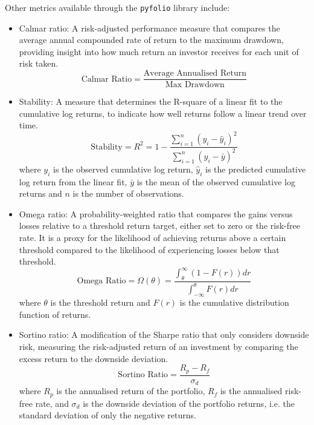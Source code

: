 Other metrics available through the \texttt{pyfolio} library include:
\begin{itemize}
    \item Calmar ratio: A risk-adjusted performance measure that compares the average annual compounded rate of return to the maximum drawdown, providing insight into how much return an investor receives for each unit of risk taken.
    \begin{equation}
        \text{Calmar Ratio} = \frac{\text{Average Annualised Return}}{\text{Max Drawdown}}
    \end{equation}
    \item Stability: A measure that determines the R-square of a linear fit to the cumulative log returns, to indicate how well returns follow a linear trend over time.
    \begin{equation}
        \text{Stability} = R^2 = 1 - \frac{\sum_{i=1}^{n} (y_i - \hat{y}_i)^2}{\sum_{i=1}^{n} (y_i - \bar{y})^2}
    \end{equation}
    where $y_i$ is the observed cumulative log return, $\hat{y}_i$ is the predicted cumulative log return from the linear fit, $\bar{y}$ is the mean of the observed cumulative log returns and $n$ is the number of observations.
    \item Omega ratio: A probability-weighted ratio that compares the gains versus losses relative to a threshold return target, either set to zero or the risk-free rate. It is a proxy for the likelihood of achieving returns above a certain threshold compared to the likelihood of experiencing losses below that threshold.
    \begin{equation}
        \text{Omega Ratio} = \Omega\left(\theta\right) = \frac{\int_{\theta}^{\infty} \left(1-F(r)\right) dr}{\int_{-\infty}^{\theta} F(r) dr}
    \end{equation}
    where $\theta$ is the threshold return and $F(r)$ is the cumulative distribution function of returns. 
    \item Sortino ratio: A modification of the Sharpe ratio that only considers downside risk, measuring the risk-adjusted return of an investment by comparing the excess return to the downside deviation.
    \begin{equation}
        \text{Sortino Ratio} = \frac{R_p - R_f}{\sigma_d}
    \end{equation}
    where \(R_p\) is the annualised return of the portfolio, \(R_f\) is the annualised risk-free rate, and \(\sigma_d\) is the downside deviation of the portfolio returns, i.e. the standard deviation of only the negative returns.

\end{itemize}
